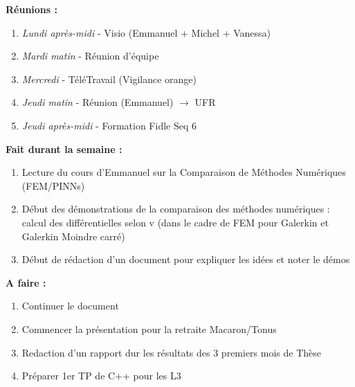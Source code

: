 \textbf{Réunions :}
\begin{enumerate}[label=\textbullet]
	\item \textit{Lundi après-midi} - Visio (Emmanuel + Michel + Vanessa)
	\item \textit{Mardi matin} - Réunion d'équipe
	\item \textit{Mercredi} - TéléTravail (Vigilance orange)
	\item \textit{Jeudi matin} - Réunion (Emmanuel) $\rightarrow$ UFR
	\item \textit{Jeudi après-midi} - Formation Fidle Seq 6
\end{enumerate}
\textbf{Fait durant la semaine :}
\begin{enumerate}[label=\textbullet]
	\item Lecture du cours d'Emmanuel sur la Comparaison de Méthodes Numériques (FEM/PINNs)
	\item Début des démonstrations de la comparaison des méthodes numériques : calcul des différentielles selon v (dans le cadre de FEM pour Galerkin et Galerkin Moindre carré)
	\item Début de rédaction d'un document pour expliquer les idées et noter le démos
\end{enumerate}
\textbf{A faire :}
\begin{enumerate}[label=\textbullet]
	\item Continuer le document
	\item Commencer la présentation pour la retraite Macaron/Tonus
	\item Redaction d'un rapport dur les résultats des 3 premiers mois de Thèse
	\item Préparer 1er TP de C++ pour les L3
\end{enumerate}